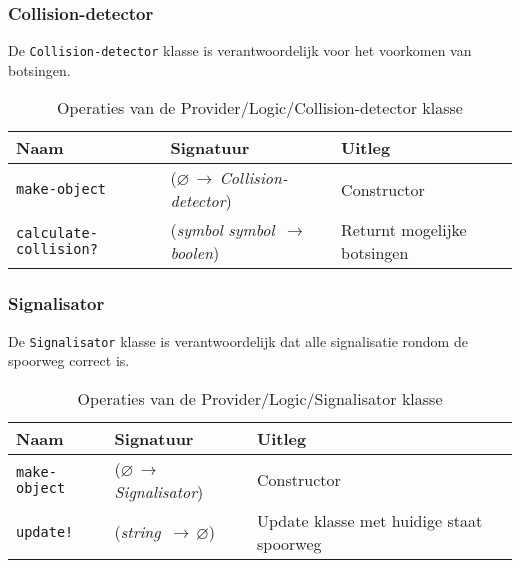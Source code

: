 \documentclass[a4paper, 11pt]{article}
\newcommand{\naar}{\,$\rightarrow$\,}
\renewcommand{\empty}{$\varnothing$}
\newcommand{\<}{\scriptsize\textless\normalsize}
\renewcommand{\>}{\scriptsize\textgreater\normalsize}
\begin{document}
\subsubsection{Collision-detector} %
De \texttt{Collision-detector} klasse is verantwoordelijk voor het voorkomen van botsingen.
\begin{table}[H]
	\begin{center}
		\begin{tabular}{|l l l|}
			\hline
			\textbf{Naam} & \textbf{Signatuur} & \textbf{Uitleg}\\
			\hline
			\texttt{make-object} & (\empty \naar \textit{Collision-detector}) & Constructor\\
			\hline
			\texttt{calculate-collision?} & (\textit{symbol} \textit{symbol} \naar \textit{boolen}) & Returnt mogelijke botsingen\\
			\hline
		\end{tabular}
		\caption{Operaties van de Provider/Logic/Collision-detector klasse}
	\end{center}
\end{table}

\subsubsection{Signalisator} %
De \texttt{Signalisator} klasse is verantwoordelijk dat alle signalisatie rondom de spoorweg correct is.
\begin{table}[H]
	\begin{center}
		\begin{tabular}{|l l l|}
			\hline
			\textbf{Naam} & \textbf{Signatuur} & \textbf{Uitleg}\\
			\hline
			\texttt{make-object} & (\empty \naar \textit{Signalisator}) & Constructor\\
			\hline
			\texttt{update!} & (\textit{string} \naar \empty) & Update klasse met huidige staat spoorweg\\
			\hline
		\end{tabular}
		\caption{Operaties van de Provider/Logic/Signalisator klasse}
	\end{center}
\end{table}
\end{document}
